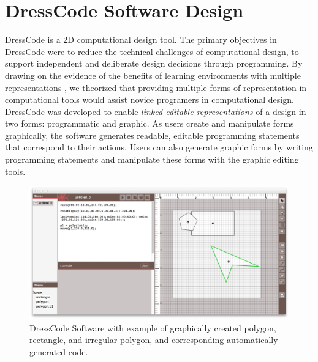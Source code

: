 \documentclass{sigchi}
\begin{document}
\section{DressCode Software Design} %
DressCode is a 2D computational design tool. The primary objectives in DressCode were to reduce the technical challenges of computational design, to support independent and deliberate design decisions through programming. By drawing on the evidence of the benefits of learning environments with multiple representations \cite{ainsworth}, we theorized that providing multiple forms of representation in computational tools would assist novice programers in computational design. DressCode was developed to enable \emph{linked editable representations} of a design in two forms: programmatic and graphic. As users create and manipulate forms graphically, the software generates readable, editable programming statements that correspond to their actions. Users can also generate graphic forms by writing programming statements and manipulate these forms with the graphic editing tools. %
\begin{center}
\begin{figure}[h!]
\includegraphics[width=\columnwidth]{images/auto_generated_code.jpg}
\caption{DressCode Software with example of graphically created polygon, rectangle, and irregular polygon, and corresponding automatically-generated code.}
\label{fig:auto_generated_code}
\end{figure}
\end{center}
\end{document}
